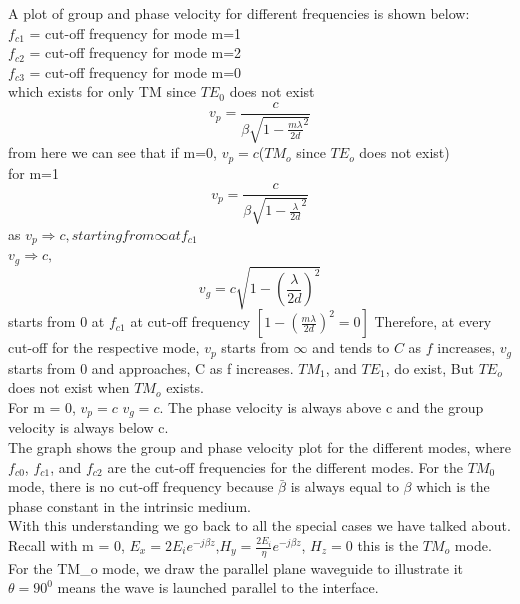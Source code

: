 A plot of group and phase velocity for different frequencies is shown below:\\
$f_{c1}$ = cut-off frequency for mode m=1\\
$f_{c2}$ = cut-off frequency for mode m=2\\
$f_{c3}$ = cut-off frequency for mode m=0\\
which exists for only TM since $TE_0$ does not exist
\begin{equation*}
v_{p}= \frac{c}{\beta \sqrt{1- \frac{m\lambda}{2d}^{2}}}
\end{equation*}
from here we can see that if m=0, $v_{p} =c$($TM_o$ since $TE_o$ does not exist)\\
for m=1\\
\begin{equation*}
v_{p}= \frac{c}{\beta \sqrt{1- \frac{\lambda}{2d}^{2}}}
\end{equation*}
as $v_{p} \Rightarrow c, starting from \infty at f_{c1}$\\
$v_{g} \Rightarrow c,$
\begin{equation*}
v_{g}= c\sqrt{1-(\frac{\lambda}{2d})^{2}}
\end{equation*}
starts from 0 at $f_{c1}$ at cut-off frequency $[1-(\frac{m\lambda}{2d})^{2} = 0]$
Therefore, at every cut-off for the respective mode, $v_{p}$ starts from $\infty$ and tends to $C$ as $f$ increases, $v_{g}$ starts from 0 and approaches, C as f increases. $TM_{1}$, and $TE_{1}$, do exist, But $TE_o$ does not exist when $TM_o$ exists.\\ 
For m = 0, $v_{p}=c$ $v_{g}=c$. The phase velocity is always above c and the group velocity is always below c.\\
The graph shows the group and phase velocity plot for the different modes, where $f_{c0}$, $f_{c1}$, and $f_{c2}$ are the cut-off frequencies for the different modes. For the $TM_0$ mode, there is no cut-off frequency because $\bar{\beta}$ is always equal to $\beta$ which is the phase constant in the intrinsic medium.\\
With this understanding we go back to all the special cases we have talked about. Recall with m = 0, $E_{x} =2E_{i} e^{-j\beta z}$,$H_{y} = \frac{2E_{i}}{\eta} e^{-j\beta z}$, $H_{z} =0$ this is the $TM_o$ mode.\\
For the TM_o mode, we draw the parallel plane waveguide to illustrate it $\theta =90^{0}$ means the wave is launched parallel to the interface.\\
